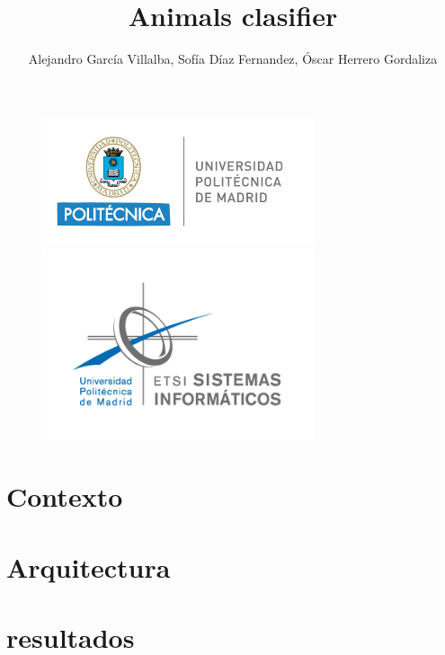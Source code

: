 \documentclass{article}
\title{Animals clasifier}
\author{Alejandro García Villalba, Sofía Díaz Fernandez, Óscar Herrero Gordaliza}
\begin{document}
    \maketitle
    \begin{figure}
        \centering
        \includegraphics[width=8cm]{politecnica_logo.png}
        \includegraphics[width=8cm]{etsisi_logo.png}       
    \end{figure}

    \newpage

    \tableofcontents
        \section{Contexto}
        \section{Arquitectura}
        \section{resultados}
\end{document}
